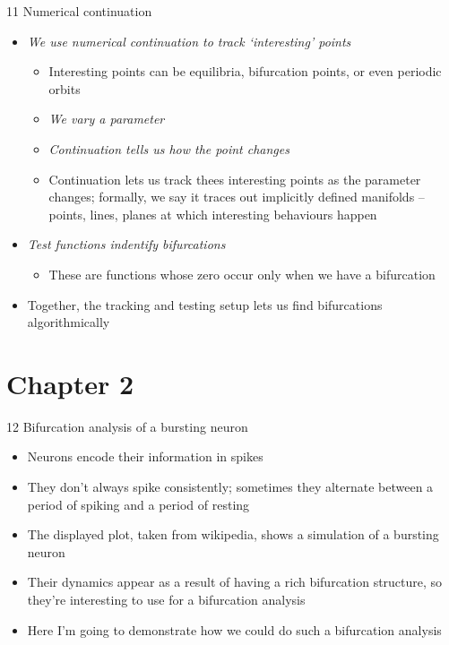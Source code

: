 \documentclass[presentation]{beamer}
\begin{document}
\begin{frame}[label={sec:org1cb71d0}]{11 Numerical continuation}
\begin{itemize}
\item \emph{We use numerical continuation to track `interesting' points}
\begin{itemize}
\item Interesting points can be equilibria, bifurcation points, or even periodic orbits
\item \emph{We vary a parameter}
\item \emph{Continuation tells us how the point changes}
\item Continuation lets us track thees interesting points as the parameter changes; formally, we say it traces out implicitly defined manifolds -- points, lines, planes at which interesting behaviours happen
\end{itemize}
\item \emph{Test functions indentify bifurcations}
\begin{itemize}
\item These are functions whose zero occur only when we have a bifurcation
\end{itemize}
\item Together, the tracking and testing setup lets us find bifurcations algorithmically
\end{itemize}
\end{frame}

\section{Chapter 2}
\label{sec:org334fbc3}
\begin{frame}[label={sec:org54016c9}]{12 Bifurcation analysis of a bursting neuron}
\begin{itemize}
\item Neurons encode their information in spikes
\item They don't always spike consistently; sometimes they alternate between a period of spiking and a period of resting
\item The displayed plot, taken from wikipedia, shows a simulation of a bursting neuron
\item Their dynamics appear as a result of having a rich bifurcation structure, so they're interesting to use for a bifurcation analysis
\item Here I'm going to demonstrate how we could do such a bifurcation analysis
\end{itemize}
\end{frame}
\end{document}
